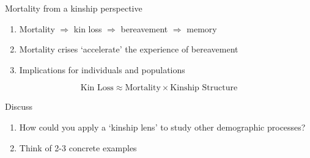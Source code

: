 ﻿\documentclass{beamer}
\begin{document}




\begin{frame}{Mortality from a kinship perspective}
    \begin{enumerate}
        \item Mortality $\Rightarrow$ kin loss $\Rightarrow$ bereavement $\Rightarrow$ memory
        \item Mortality crises `accelerate' the experience of bereavement
        \item Implications for individuals and populations
    \end{enumerate}
    
    \begin{equation*}
        \text{Kin Loss} \approx \text{Mortality} \times \text{Kinship Structure}
    \end{equation*}

\end{frame}


\begin{frame}{Discuss}
    \begin{enumerate}
        \item How could you apply a `kinship lens' to study other demographic processes?
        \item Think of 2-3 concrete examples
    \end{enumerate}
\end{frame}


\end{document}

